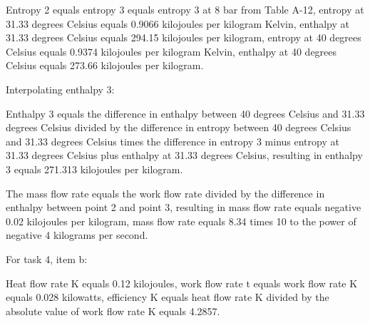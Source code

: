 Entropy 2 equals entropy 3 equals entropy 3 at 8 bar from Table A-12, entropy at 31.33 degrees Celsius equals 0.9066 kilojoules per kilogram Kelvin, enthalpy at 31.33 degrees Celsius equals 294.15 kilojoules per kilogram, entropy at 40 degrees Celsius equals 0.9374 kilojoules per kilogram Kelvin, enthalpy at 40 degrees Celsius equals 273.66 kilojoules per kilogram.

Interpolating enthalpy 3:

Enthalpy 3 equals the difference in enthalpy between 40 degrees Celsius and 31.33 degrees Celsius divided by the difference in entropy between 40 degrees Celsius and 31.33 degrees Celsius times the difference in entropy 3 minus entropy at 31.33 degrees Celsius plus enthalpy at 31.33 degrees Celsius, resulting in enthalpy 3 equals 271.313 kilojoules per kilogram.

The mass flow rate equals the work flow rate divided by the difference in enthalpy between point 2 and point 3, resulting in mass flow rate equals negative 0.02 kilojoules per kilogram, mass flow rate equals 8.34 times 10 to the power of negative 4 kilograms per second.

For task 4, item b:

Heat flow rate K equals 0.12 kilojoules, work flow rate t equals work flow rate K equals 0.028 kilowatts, efficiency K equals heat flow rate K divided by the absolute value of work flow rate K equals 4.2857.